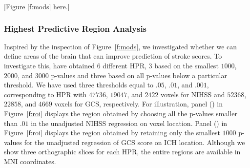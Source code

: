 \documentclass[10pt]{article}\usepackage[]{graphicx}\usepackage[]{color}
\begin{document}
[Figure \ref{f:mods} here.]

\subsubsection{Highest Predictive Region Analysis}






Inspired by the inspection of Figure~\ref{f:mods}, we investigated whether we can define areas of the brain that can improve prediction of stroke scores. To investigate this, have obtained 6 different HPR, 3 based on the smallest $1000$, $2000$, and $3000$ p-values and three based on all p-values below a particular threshold. We have used three thresholds equal to $.05$, $.01$, and $.001$, corresponding to HPR with $47736$, $19047$, and $2422$ voxels for NIHSS and $52368$, $22858$, and $4669$ voxels for GCS, respectively. For illustration, panel (\protect{}) in Figure~\ref{f:roi} displays the region obtained by choosing all the p-values smaller than $.01$ in the unadjusted NIHSS regression on voxel location.  Panel (\protect{}) in Figure~\ref{f:roi} displays the region obtained by retaining only the smallest $1000$ p-values for the unadjusted regression of GCS score on ICH location. Although we show three orthographic slices for each HPR, the entire regions are available in MNI coordinates. 


%
%
%
%
\end{document}
